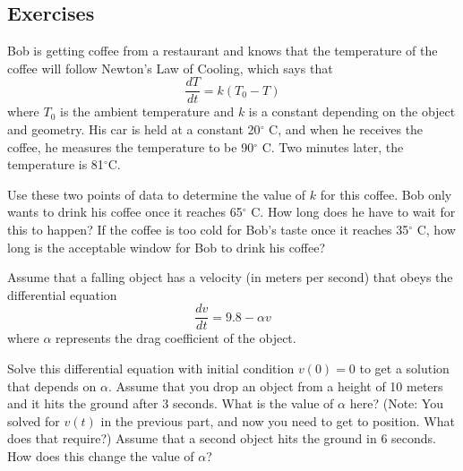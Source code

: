 \subsection{Exercises}

\begin{exercise}
Bob is getting coffee from a restaurant and knows that the temperature of the coffee will follow Newton's Law of Cooling, which says that
\begin{equation*}
\frac{dT}{dt} = k(T_0 - T)
\end{equation*}
where $T_0$ is the ambient temperature and $k$ is a constant depending on the object and geometry. His car is held at a constant 20$^\circ$ C, and when he receives the coffee, he measures the temperature to be 90$^\circ$ C. Two minutes later, the temperature is 81$^\circ$C.
\begin{tasks}
\task Use these two points of data to determine the value of $k$ for this coffee.
\task Bob only wants to drink his coffee once it reaches 65$^\circ$ C. How long does he have to wait for this to happen? 
\task If the coffee is too cold for Bob's taste once it reaches 35$^\circ$ C, how long is the acceptable window for Bob to drink his coffee?
\end{tasks} 
\end{exercise}

\begin{exercise}
Assume that a falling object has a velocity (in meters per second) that obeys the differential equation
\begin{equation*}
\frac{dv}{dt} = 9.8 - \alpha v
\end{equation*}
where $\alpha$ represents the drag coefficient of the object.
\begin{tasks}
\task Solve this differential equation with initial condition $v(0) = 0$ to get a solution that depends on $\alpha$. 
\task Assume that you drop an object from a height of 10 meters and it hits the ground after $3$ seconds. What is the value of $\alpha$ here? (Note: You solved for $v(t)$ in the previous part, and now you need to get to position. What does that require?)
\task Assume that a second object hits the ground in 6 seconds. How does this change the value of $\alpha$?
\end{tasks}
\end{exercise}

